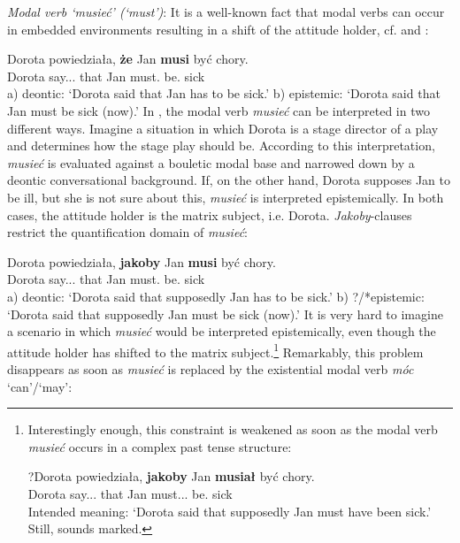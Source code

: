 \documentclass[output=paper
,modfonts
,nonflat]{langsci/langscibook}
\begin{document}
\emph{Modal verb `musieć' (`must')}: It is a well-known fact that modal verbs can occur in embedded environments resulting in a shift of the attitude holder, cf. \textcite{Hacquard2006} and \textcite{Hacquard-Wellwood2012}:  

\ea \gll Dorota powiedziała, \textbf{że} Jan \textbf{musi} być chory. \label{must} \\
		Dorota say.{\lptcp}.{\sg}.{\fem} that Jan must.{\thirdperson}{\sg} be.{\infv} sick \\
\glt	a) deontic: `Dorota said that Jan has to be sick.' \newline
\glt	b) epistemic: `Dorota said that Jan must be sick (now).'
\z   
In , the modal verb \emph{musieć} can be interpreted in two different ways. Imagine a situation in which Dorota is a stage director of a play and determines how the stage play should be. According to this interpretation, \emph{musieć} is evaluated against a bouletic modal base and narrowed down by a deontic conversational background. If, on the other hand, Dorota supposes Jan to be ill, but she is not sure about this, \emph{musieć} is interpreted epistemically. In both cases, the attitude holder is the matrix subject, i.e. Dorota. \emph{Jakoby}-clauses restrict the quantification domain of \emph{musieć}: 
 
\ea \gll Dorota powiedziała, \textbf{jakoby} Jan \textbf{musi} być chory. \\
		Dorota say.{\lptcp}.{\sg}.{\fem} that Jan must.{\thirdperson}{\sg} be.{\infv} sick \\
\glt	a) deontic: `Dorota said that supposedly Jan has to be sick.' \newline
\glt	b) ?/*epistemic: `Dorota said that supposedly Jan must be sick (now).'
\z
It is very hard to imagine a scenario in which \emph{musieć} would be interpreted epistemically, even though the attitude holder has shifted to the matrix subject.\footnote{Interestingly enough, this constraint is weakened as soon as the modal verb \emph{musieć} occurs in a complex past tense structure:

\ea \gll ?Dorota powiedziała, \textbf{jakoby} Jan \textbf{musiał} być chory. \label{bluh} \\
		Dorota say.{\lptcp}.{\sg}.{\fem} that Jan must.{\lptcp}.{\sg}.{\masc} be.{\infv} sick \\
\glt	Intended meaning: `Dorota said that supposedly Jan must have been sick.'
\z
Still,  sounds marked. 
}
 Remarkably, this problem disappears as soon as \emph{musieć} is replaced by the existential modal verb \emph{móc} `can'\slash `may':
\end{document}
